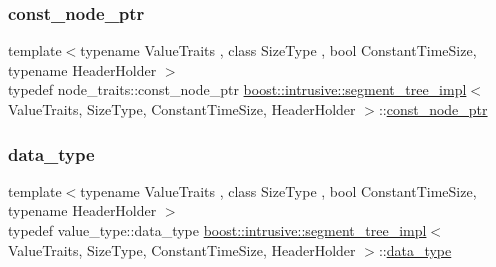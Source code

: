 \mbox{\label{classboost_1_1intrusive_1_1segment__tree__impl_aa0f2dc05aa707192c6daa27f509642ed}} 
\subsubsection{\texorpdfstring{const\+\_\+node\+\_\+ptr}{const\_node\_ptr}}
{\footnotesize\ttfamily template$<$typename Value\+Traits , class Size\+Type , bool Constant\+Time\+Size, typename Header\+Holder $>$ \\
typedef node\+\_\+traits\+::const\+\_\+node\+\_\+ptr \hyperlink{classboost_1_1intrusive_1_1segment__tree__impl}{boost\+::intrusive\+::segment\+\_\+tree\+\_\+impl}$<$ Value\+Traits, Size\+Type, Constant\+Time\+Size, Header\+Holder $>$\+::\hyperlink{classboost_1_1intrusive_1_1segment__tree__impl_aa0f2dc05aa707192c6daa27f509642ed}{const\+\_\+node\+\_\+ptr}}

\mbox{\label{classboost_1_1intrusive_1_1segment__tree__impl_a92c83c631da1bcdaa004756ea98b2ec5}} 
\subsubsection{\texorpdfstring{data\+\_\+type}{data\_type}}
{\footnotesize\ttfamily template$<$typename Value\+Traits , class Size\+Type , bool Constant\+Time\+Size, typename Header\+Holder $>$ \\
typedef value\+\_\+type\+::data\+\_\+type \hyperlink{classboost_1_1intrusive_1_1segment__tree__impl}{boost\+::intrusive\+::segment\+\_\+tree\+\_\+impl}$<$ Value\+Traits, Size\+Type, Constant\+Time\+Size, Header\+Holder $>$\+::\hyperlink{classboost_1_1intrusive_1_1segment__tree__impl_a92c83c631da1bcdaa004756ea98b2ec5}{data\+\_\+type}}

\mbox{\label{classboost_1_1intrusive_1_1segment__tree__impl_a9f1be9b01be5078fb59b2e34520b374a}} 
